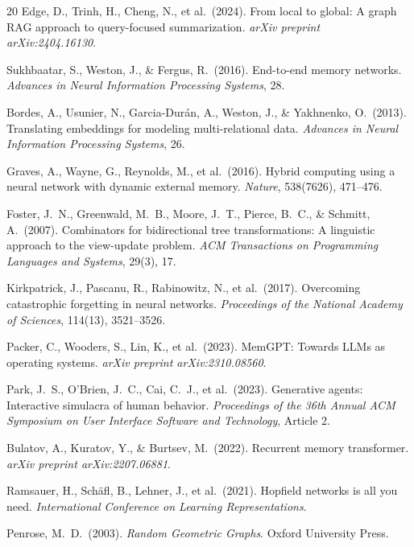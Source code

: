 \documentclass[11pt,a4paper]{article}
\theoremstyle{definition}
\begin{document}
\begin{thebibliography}{20}
Edge, D., Trinh, H., Cheng, N., et al.\ (2024).
\newblock From local to global: A graph {RAG} approach to query-focused summarization.
\newblock \textit{arXiv preprint arXiv:2404.16130}.

Sukhbaatar, S., Weston, J., \& Fergus, R.\ (2016).
\newblock End-to-end memory networks.
\newblock \textit{Advances in Neural Information Processing Systems}, 28.

Bordes, A., Usunier, N., Garcia-Dur\'an, A., Weston, J., \& Yakhnenko, O.\ (2013).
\newblock Translating embeddings for modeling multi-relational data.
\newblock \textit{Advances in Neural Information Processing Systems}, 26.

Graves, A., Wayne, G., Reynolds, M., et al.\ (2016).
\newblock Hybrid computing using a neural network with dynamic external memory.
\newblock \textit{Nature}, 538(7626), 471--476.

Foster, J.~N., Greenwald, M.~B., Moore, J.~T., Pierce, B.~C., \& Schmitt, A.\ (2007).
\newblock Combinators for bidirectional tree transformations: A linguistic approach to the view-update problem.
\newblock \textit{ACM Transactions on Programming Languages and Systems}, 29(3), 17.

Kirkpatrick, J., Pascanu, R., Rabinowitz, N., et al.\ (2017).
\newblock Overcoming catastrophic forgetting in neural networks.
\newblock \textit{Proceedings of the National Academy of Sciences}, 114(13), 3521--3526.

Packer, C., Wooders, S., Lin, K., et al.\ (2023).
\newblock MemGPT: Towards LLMs as operating systems.
\newblock \textit{arXiv preprint arXiv:2310.08560}.

Park, J.~S., O'Brien, J.~C., Cai, C.~J., et al.\ (2023).
\newblock Generative agents: Interactive simulacra of human behavior.
\newblock \textit{Proceedings of the 36th Annual ACM Symposium on User Interface Software and Technology}, Article 2.

Bulatov, A., Kuratov, Y., \& Burtsev, M.\ (2022).
\newblock Recurrent memory transformer.
\newblock \textit{arXiv preprint arXiv:2207.06881}.

Ramsauer, H., Sch\"afl, B., Lehner, J., et al.\ (2021).
\newblock Hopfield networks is all you need.
\newblock \textit{International Conference on Learning Representations}.

Penrose, M.~D.\ (2003).
\newblock \textit{Random Geometric Graphs}.
\newblock Oxford University Press.

\end{thebibliography}
\end{document}
